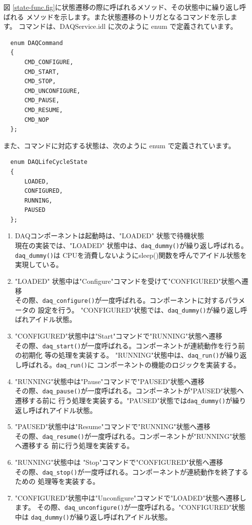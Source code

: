 \documentclass[a4j,10pt,dvips,onecolumn,oneside,final]{jarticle}%
\begin{document}
図 \ref{state-func.fig}に状態遷移の際に呼ばれるメソッド、その状態中に繰り返し呼ばれる
メソッドを示します。また状態遷移のトリガとなるコマンドを示します。
コマンドは、DAQService.idl に次のように enum で定義されています。
\begin{Verbatim}
  enum DAQCommand
  {
      CMD_CONFIGURE,
      CMD_START,
      CMD_STOP,
      CMD_UNCONFIGURE,
      CMD_PAUSE,
      CMD_RESUME,
      CMD_NOP
  };
\end{Verbatim}
また、コマンドに対応する状態は、次のように enum で定義されています。
\begin{Verbatim}
  enum DAQLifeCycleState
  {
      LOADED,
      CONFIGURED,
      RUNNING,
      PAUSED
  };
\end{Verbatim}

\begin{enumerate}
\item DAQコンポーネントは起動時は、"LOADED" 状態で待機状態\\
  現在の実装では、"LOADED" 状態中は、\verb|daq_dummy()|が繰り返し呼ばれる。
  \verb|daq_dummy()|は
  CPUを消費しないようにsleep()関数を呼んでアイドル状態を実現している。

\item "LOADED" 状態中は"Configure"コマンドを受けて"CONFIGURED"状態へ遷移\\
  その際、\verb|daq_configure()|が一度呼ばれる。コンポーネントに対するパラメータの
  設定を行う。
  "CONFIGURED"状態では、\verb|daq_dummy()|が繰り返し呼ばれアイドル状態。

\item "CONFIGURED"状態中は"Start"コマンドで"RUNNING"状態へ遷移\\
  その際、\verb|daq_start()|が一度呼ばれる。コンポーネントが連続動作を行う前の初期化
  等の処理を実装する。
  "RUNNING"状態中は、\verb|daq_run()|が繰り返し呼ばれる。\verb|daq_run()|に
  コンポーネントの機能のロジックを実装する。

\item "RUNNING"状態中は"Pause"コマンドで"PAUSED"状態へ遷移\\
  その際、\verb|daq_pause()|が一度呼ばれる。コンポーネントが"PAUSED"状態へ遷移する前に
  行う処理を実装する。"PAUSED"状態では\verb|daq_dummy()|が繰り返し呼ばれアイドル状態。

\item "PAUSED"状態中は"Resume"コマンドで"RUNNING"状態へ遷移\\
  その際、\verb|daq_resume()|が一度呼ばれる。コンポーネントが"RUNNING"状態へ遷移する
  前に行う処理を実装する。

\item "RUNNING"状態中は "Stop"コマンドで"CONFIGURED"状態へ遷移\\
  その際、\verb|daq_stop()|が一度呼ばれる。コンポーネントが連続動作を終了するための
  処理等を実装する。

\item "CONFIGURED"状態中は"Unconfigure"コマンドで"LOADED"状態へ遷移します。
  その際、\verb|daq_unconfigure()|が一度呼ばれる。"CONFIGURED"状態中は
  \verb|daq_dummy()|が繰り返し呼ばれアイドル状態。
\end{enumerate}
\end{document}
